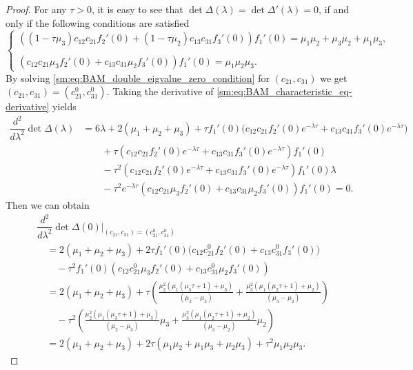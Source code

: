 \begin{proof}
For any $\tau>0$, it is easy to see that $\det\Delta(\lambda)=\det\Delta'(\lambda)=0$,
if and only if the following conditions are satisfied
\begin{equation}
\begin{cases}
\left((1-\tau\mu_{3})c_{12}c_{21}f_{2}'(0)+(1-\tau\mu_{2})c_{13}c_{31}f_{3}'(0)\right)f_{1}'(0)=\mu_{1}\mu_{2}+\mu_{3}\mu_{2}+\mu_{1}\mu_{3},\\
\\
\left(c_{12}c_{21}\mu_{3}f_{2}'(0)+c_{13}c_{31}\mu_{2}f_{3}'(0)\right)f_{1}'(0)=\mu_{1}\mu_{2}\mu_{3}.
\end{cases}\label{sm:eq:BAM_double_eigvalue_zero_condition}
\end{equation}
By solving \cref{sm:eq:BAM_double_eigvalue_zero_condition} for $(c_{21},c_{31})$
we get $(c_{21},c_{31})=(c_{21}^{0},c_{31}^{0})$.
Taking the derivative of \cref{sm:eq:BAM_characteristic_eq-derivative}
yields
\begin{align}
\dfrac{d^{2}}{d\lambda^{2}}\det\Delta(\lambda) & =6\lambda+2\left(\mu_{1}+\mu_{2}+\mu_{3}\right)+\tau f_{1}'(0)\big(c_{12}c_{21}f_{2}'(0)e^{-\lambda\tau}+c_{13}c_{31}f_{3}'(0)e^{-\lambda\tau}\big)\nonumber \\
 & \qquad+\tau\left(c_{12}c_{21}f_{2}'(0)e^{-\lambda\tau}+c_{13}c_{31}f_{3}'(0)e^{-\lambda\tau}\right)f_{1}'(0)\nonumber \\
 & \qquad-\tau^{2}\left(c_{12}c_{21}f_{2}'(0)e^{-\lambda\tau}+c_{13}c_{31}f_{3}'(0)e^{-\lambda\tau}\right)f_{1}'(0)\lambda\nonumber \\
 & \qquad-\tau^{2}e^{-\lambda\tau}\left(c_{12}c_{21}\mu_{3}f_{2}'(0)+c_{13}c_{31}\mu_{2}f_{3}'(0)\right)f_{1}'(0)=0.\label{sm:eq:BAM_characteristic_eq-derivative-1}
\end{align}
Then we can obtain
\begin{align*}
 & \dfrac{d^{2}}{d\lambda^{2}}\det\Delta(0)\vert_{(c_{21},c_{31})=(c_{21}^{0},c_{31}^{0})}\\
 & \quad=2\left(\mu_{1}+\mu_{2}+\mu_{3}\right)+2\tau f_{1}'(0)\big(c_{12}c_{21}^{0}f_{2}'(0)+c_{13}c_{31}^{0}f_{3}'(0)\big)\\
 & \qquad-\tau^{2}f_{1}'(0)\left(c_{12}c_{21}^{0}\mu_{3}f_{2}'(0)+c_{13}c_{31}^{0}\mu_{2}f_{3}'(0)\right)\\
 & \quad=2\left(\mu_{1}+\mu_{2}+\mu_{3}\right)+\tau\left(\frac{\mu_{2}^{2}\left(\mu_{1}\left(\mu_{3}\tau+1\right)+\mu_{3}\right)}{\left(\mu_{2}-\mu_{3}\right)}+\frac{\mu_{3}^{2}\left(\mu_{1}\left(\mu_{2}\tau+1\right)+\mu_{2}\right)}{\left(\mu_{3}-\mu_{2}\right)}\right)\\
 & \qquad-\tau^{2}\left(\frac{\mu_{2}^{2}\left(\mu_{1}\left(\mu_{3}\tau+1\right)+\mu_{3}\right)}{\left(\mu_{2}-\mu_{3}\right)}\mu_{3}+\frac{\mu_{3}^{2}\left(\mu_{1}\left(\mu_{2}\tau+1\right)+\mu_{2}\right)}{\left(\mu_{3}-\mu_{2}\right)}\mu_{2}\right)\\
 & \quad=2\left(\mu_{1}+\mu_{2}+\mu_{3}\right)+2\tau\left(\mu_{1}\mu_{2}+\mu_{1}\mu_{3}+\mu_{2}\mu_{3}\right)+\tau^{2}\mu_{1}\mu_{2}\mu_{3}.
\end{align*}


\end{proof}
